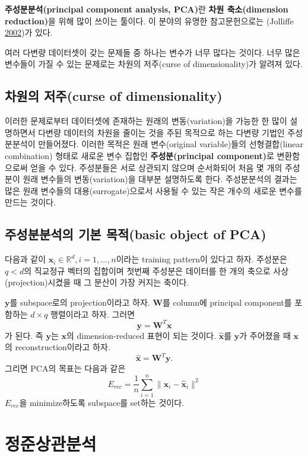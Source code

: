 \documentclass[b5paper,]{book}
\theoremstyle{definition}
\theoremstyle{definition}
\theoremstyle{definition}
\theoremstyle{remark}
\begin{document}
\textbf{주성분분석(principal component analysis, PCA)}란 \textbf{차원
축소(dimension reduction)}을 위해 많이 쓰이는 툴이다. 이 분야의 유명한
참고문헌으로는 (Jolliffe \protect\hyperlink{ref-Jolliffe2002}{2002})가
있다.

여러 다변량 데이터셋이 갖는 문제들 중 하나는 변수가 너무 많다는 것이다.
너무 많은 변수들이 가질 수 있는 문제로는 차원의 저주(curse of
dimensionality)가 알려져 있다.

\section{차원의 저주(curse of
dimensionality)}\label{-curse-of-dimensionality}

이러한 문제로부터 데이터셋에 존재하는 원래의 변동(variation)을 가능한 한
많이 설명하면서 다변량 데이터의 차원을 줄이는 것을 주된 목적으로 하는
다변량 기법인 주성분분석이 만들어졌다. 이러한 목적은 원래 변수(original
variable)들의 선형결합(linear combination) 형태로 새로운 변수 집합인
\textbf{주성분(principal component)}로 변환함으로써 얻을 수 있다.
주성분들은 서로 상관되지 않으며 순서화되어 처음 몇 개의 주성분이 원래
변수들의 변동(variation)을 대부분 설명하도록 한다. 주성분분석의 결과는
많은 원래 변수들의 대용(surrogate)으로서 사용될 수 있는 작은 개수의
새로운 변수를 만드는 것이다.

\section{주성분분석의 기본 목적(basic object of
PCA)}\label{--basic-object-of-pca}

다음과 같이 \(\mathbf{x}_{i}\in\mathbb{R}^{d}, i=1,\ldots, n\)이라는
training pattern이 있다고 하자. 주성분은 \(q <d\)의 직교정규 벡터의
집합이며 첫번째 주성분은 데이터를 한 개의 축으로 사상(projection)시켰을
때 그 분산이 가장 커지는 축이다.

\(\mathbf{y}\)를 subspace로의 projection이라고 하자. \(\mathbf{W}\)를
column에 principal component를 포함하는 \(d\times q\) 행렬이라고 하자.
그러면 \[\mathbf{y}=\mathbf{W}^{T}\mathbf{x}\] 가 된다. 즉
\(\mathbf{y}\)는 \(\mathbf{x}\)의 dimension-reduced 표현이 되는 것이다.
\(\hat{\mathbf{x}}\)를 \(\mathbf{y}\)가 주어졌을 때 \(\mathbf{x}\)의
reconstruction이라고 하자.
\[\hat{\mathbf{x}}=\mathbf{W}^{T}\mathbf{y}.\] 그리면 PCA의 목표는
다음과 같은
\[E_{rec}=\frac{1}{n}\sum_{i=1}^{n}\| \mathbf{x}_{i}-\hat{\mathbf{x}}_{i}\|^{2}\]
\(E_{rec}\)을 minimize하도록 subspace를 set하는 것이다.

\chapter{정준상관분석}\label{CCA}
\end{document}
